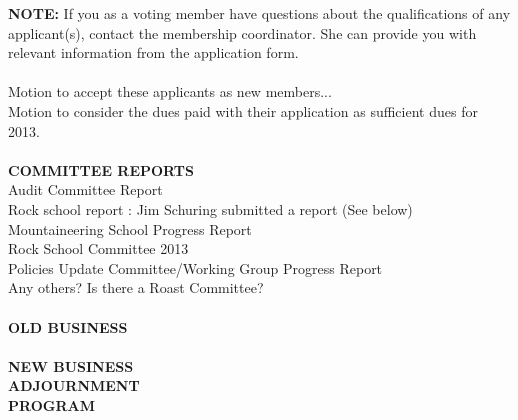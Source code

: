 \documentclass[10pt,a4paper]{article}
\begin{document}
\begin{multicols}{2}
\textbf{NOTE:} If you as a voting member have questions about the qualifications of any applicant(s), contact the membership coordinator. She can provide you with relevant information from the application form.
\\
\\
Motion to accept these applicants as new members...\\
Motion to consider the dues paid with their application as sufficient dues for 2013.
\\
\\
\textbf{COMMITTEE REPORTS}\\
Audit Committee Report \\
Rock school report : Jim Schuring submitted a report (See below)\\
Mountaineering School Progress Report\\
Rock School Committee 2013\\
Policies Update Committee/Working Group Progress Report \\
Any others?  Is there a Roast Committee? 
\\
\\
\textbf{OLD BUSINESS}
\\
\\
\textbf{NEW BUSINESS}
\\
\textbf{ADJOURNMENT}\\
\textbf{PROGRAM}


\end{multicols}
\end{document}
